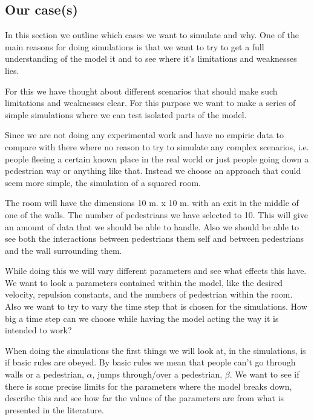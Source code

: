 
\subsection{Our case(s)}
In this section we outline which cases we want to simulate and why.
One of the main reasons for doing simulations is that we want to try to get 
a full understanding of the model it and to see where it's limitations and
weaknesses lies.

For this we have thought about different scenarios that should make such limitations
and weaknesses clear. For this purpose we want to make a series of simple simulations
where we can test isolated parts of the model. 

Since we are not doing any experimental work and have no 
empiric data to compare with there where no reason to try to simulate any complex 
scenarios, i.e. people fleeing a certain known place in the real world or just 
people going down a pedestrian way or anything like that. Instead we choose an 
approach that could seem more simple, the simulation of a squared room.

The room will have the dimensions 10 m. x 10 m. with an exit in the middle of one 
of the walls. The number of pedestrians we have selected to 10. This will give an 
amount of data that we should be able to handle. Also we should be able to see both 
the interactions between pedestrians them self and between pedestrians and the wall 
surrounding them. 

While doing this we will vary different parameters and see what effects this have. 
We want to look a parameters contained within the model, like the desired velocity, 
repulsion constants, and the numbers of pedestrian within the room. Also we want to 
try to vary the time step that is chosen for the simulations. How big a time step 
can we choose while having the model acting the way it is intended to work?


When doing the simulations the first things we will look at, in the simulations, 
is if basic rules are obeyed. By basic rules we mean that people can't go through walls 
or a pedestrian, $\alpha$, jumps through/over a pedestrian, $\beta$. We want to see if 
there is some precise limits for the parameters where the model breaks down, describe 
this and see how far the values of the parameters are from what is presented in the 
literature.   

